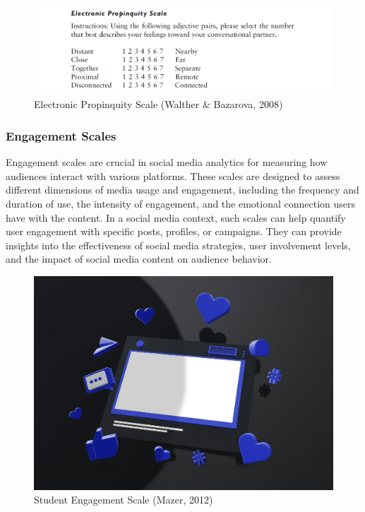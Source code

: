 \documentclass[
]{book}
\begin{document}
\begin{figure}
\centering
\includegraphics[width=1\linewidth,height=\textheight,keepaspectratio]{images/propinquity.png}
\caption{Electronic Propinquity Scale (Walther \& Bazarova, 2008)}
\end{figure}

\subsubsection*{Engagement Scales}\label{engagement-scales}

Engagement scales are crucial in social media analytics for measuring how audiences interact with various platforms. These scales are designed to assess different dimensions of media usage and engagement, including the frequency and duration of use, the intensity of engagement, and the emotional connection users have with the content. In a social media context, such scales can help quantify user engagement with specific posts, profiles, or campaigns. They can provide insights into the effectiveness of social media strategies, user involvement levels, and the impact of social media content on audience behavior.

\begin{figure}
\centering
\includegraphics[width=1\linewidth,height=\textheight,keepaspectratio]{images/engagement.jpg}
\caption{Student Engagement Scale (Mazer, 2012)}
\end{figure}
\end{document}
